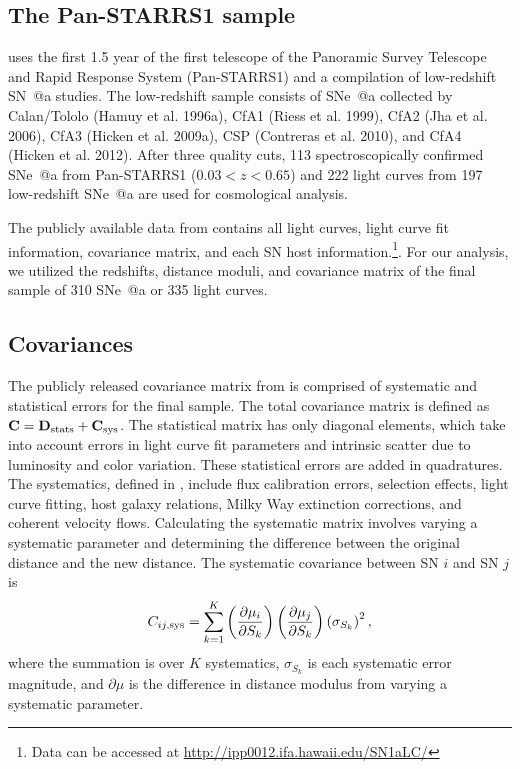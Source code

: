 \documentclass[12pt,a4paper]{article}
\makeatletter
\newcommand*{\rom}[1]{\expandafter\@slowromancap\romannumeral #1@}
\newcommand{\sn}{\mbox{SN}}
\newcommand{\sna}{\mbox{SN \rom{1}a}}
\newcommand{\snea}{\mbox{SNe \rom{1}a}}
\makeatother
\begin{document}
\subsection{The Pan-STARRS1 sample}
\label{sec:rest}
\citet{rest2014} uses the first 1.5 year of the first telescope of 
the Panoramic Survey Telescope and Rapid Response System (Pan-STARRS1) 
and a compilation of low-redshift {\sna} studies. The low-redshift 
sample consists of {\snea} collected by Calan/Tololo (Hamuy et al. 1996a), 
CfA1 (Riess et al. 1999), CfA2 (Jha et al. 2006), CfA3 (Hicken et al. 2009a), 
CSP (Contreras et al. 2010), and CfA4 (Hicken et al. 2012). After 
three quality cuts, 113 spectroscopically confirmed {\snea} from 
Pan-STARRS1 ($0.03 < z < 0.65$) and 222 light curves from 197 
low-redshift {\snea} are used for cosmological analysis. 

The publicly available data from \citet{rest2014} contains all light 
curves, light curve fit information, covariance matrix, and each {\sn} 
host information.\footnote{Data can be accessed at 
\url{http://ipp0012.ifa.hawaii.edu/SN1aLC/}}. For our analysis, we 
utilized the redshifts, distance moduli, and covariance matrix of the 
final sample of 310 {\snea} or 335 light curves.

\subsection{Covariances}
\label{sec:covariances}
The publicly released covariance matrix from \citet{rest2014} 
is comprised of systematic and statistical errors for the final sample. 
The total covariance matrix is defined as 
$\mathbf{C}= \mathbf{D}_{\textnormal{stats}}+\mathbf{C}_{\textnormal{sys}}$. The 
statistical matrix has only diagonal elements, which take into account errors 
in light curve fit parameters and intrinsic scatter due to luminosity and 
color variation. These statistical errors are added in quadratures. The 
systematics, defined in \citet{scolnic2014}, include flux calibration errors, 
selection effects, light curve fitting, host galaxy relations, Milky Way 
extinction corrections, and coherent velocity flows. Calculating the systematic 
matrix involves varying a systematic parameter and determining the difference 
between the original distance and the new distance. The systematic covariance 
between {\sn} $i$ and {\sn} $j$ is 
%
\begin{equation}
  \label{eq:RestCovMatrix}
  C_{ij,\textnormal{sys}}=\displaystyle \sum_{k = 1}^K \left(\frac{\partial \mu_i}{\partial S_k}\right)\left(\frac{\partial \mu_j}{\partial S_k}\right)\left(\sigma_{S_k}\right)^2,
\end{equation}
%
where the summation is over $K$ systematics, $\sigma_{S_k}$ is each 
systematic error magnitude, and $\partial \mu$ is the difference in 
distance modulus from varying a systematic parameter.
\end{document}
